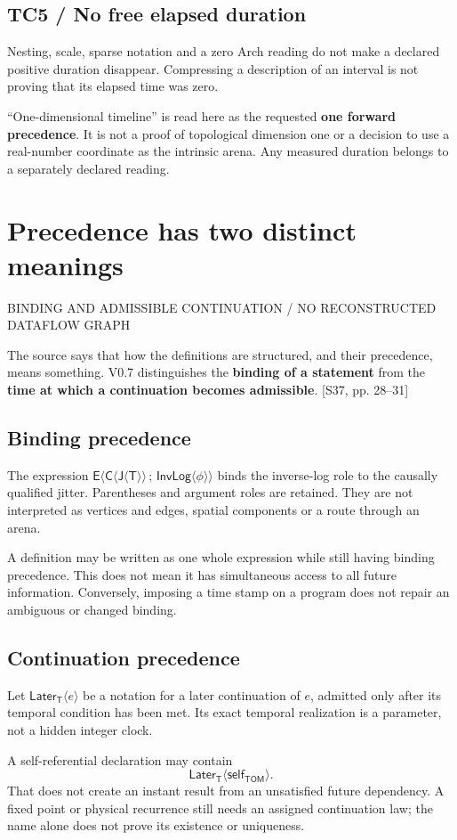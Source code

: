 \documentclass[11pt,a4paper]{article}
\newcommand{\newsec}[2]{\clearpage\section{#1}{\sffamily\footnotesize\color{teal}\MakeUppercase{#2}\par}\vspace{5pt}}
\newcommand{\src}[1]{{\small\color{muted}[S37, #1]}}
\newcommand{\Tom}{\mathsf{TOM}}
\newcommand{\Ti}{\mathsf T}
\newcommand{\Ji}{\mathsf J}
\newcommand{\Ca}{\mathsf C}
\newcommand{\En}{\mathsf E}
\newcommand{\IL}{\mathsf{InvLog}}
\newcommand{\Later}{\mathsf{Later}_{\Ti}}
\newcommand{\bind}[1]{\langle #1\rangle}
\begin{document}
\subsection{TC5 / No free elapsed duration}
Nesting, scale, sparse notation and a zero Arch reading do not make a declared positive duration disappear. Compressing a description of an interval is not proving that its elapsed time was zero.

\begin{boxx}
``One-dimensional timeline'' is read here as the requested \textbf{one forward precedence}. It is not a proof of topological dimension one or a decision to use a real-number coordinate as the intrinsic arena. Any measured duration belongs to a separately declared reading.
\end{boxx}

\newsec{Precedence has two distinct meanings}{Binding and admissible continuation / no reconstructed dataflow graph}
The source says that how the definitions are structured, and their precedence, means something. V0.7 distinguishes the \textbf{binding of a statement} from the \textbf{time at which a continuation becomes admissible}. \src{pp. 28--31}

\subsection{Binding precedence}
The expression $\En\bind{\Ca\bind{\Ji\bind{\Ti}}\,;\,\IL\bind{\phi}}$ binds the inverse-log role to the causally qualified jitter. Parentheses and argument roles are retained. They are not interpreted as vertices and edges, spatial components or a route through an arena.

A definition may be written as one whole expression while still having binding precedence. This does not mean it has simultaneous access to all future information. Conversely, imposing a time stamp on a program does not repair an ambiguous or changed binding.

\subsection{Continuation precedence}
Let $\Later\bind{e}$ be a notation for a later continuation of $e$, admitted only after its temporal condition has been met. Its exact temporal realization is a parameter, not a hidden integer clock.

A self-referential declaration may contain
\[
 \Later\bind{\mathsf{self}_{\Tom}}.
\]
That does not create an instant result from an unsatisfied future dependency. A fixed point or physical recurrence still needs an assigned continuation law; the name alone does not prove its existence or uniqueness.
\end{document}

